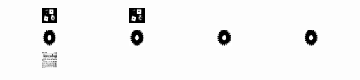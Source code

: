 \begin{table}
\begin{tabular}{c||c|c|c}
\includegraphics[width=0.2\textwidth]{img/res/e1a/alg1tipo6d0.75-block.jpg} &
\includegraphics[width=0.2\textwidth]{img/res/e1a/alg1tipo6d1.25-block.jpg} \\
\includegraphics[width=0.2\textwidth]{img/res/e1a/alg1tipo1-02.jpg} &
\includegraphics[width=0.2\textwidth]{img/res/e1a/alg1tipo6-02.jpg} &
\includegraphics[width=0.2\textwidth]{img/res/e1a/alg1tipo6d0.75-02.jpg} &
\includegraphics[width=0.2\textwidth]{img/res/e1a/alg1tipo6d1.25-02.jpg} \\
\includegraphics[width=0.2\textwidth]{img/res/e1a/alg1tipo1-09.jpg} &

\end{tabular}
\end{table}
